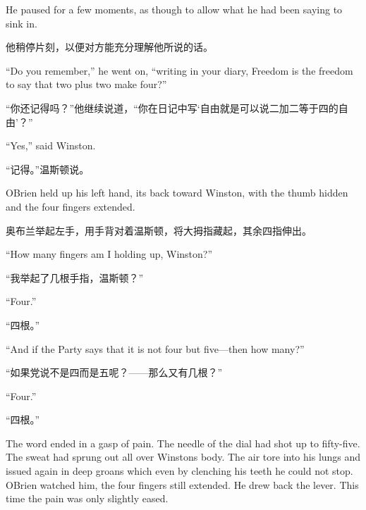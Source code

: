 \begin{paracol}{2}
\switchcolumn*

He paused for a few moments, as though to allow what he had been saying
to sink in.

\switchcolumn

他稍停片刻，以便对方能充分理解他所说的话。

\switchcolumn*

``Do you remember,'' he went on, ``writing in your diary,
\textquotesingle Freedom is the freedom to say that two plus two make
four\textquotesingle?''

\switchcolumn

``你还记得吗？''他继续说道，``你在日记中写`自由就是可以说二加二等于四的自由'？''

\switchcolumn*

``Yes,'' said Winston.

\switchcolumn

``记得。''温斯顿说。

\switchcolumn*

O\textquotesingle Brien held up his left hand, its back toward Winston,
with the thumb hidden and the four fingers extended.

\switchcolumn

奥布兰举起左手，用手背对着温斯顿，将大拇指藏起，其余四指伸出。

\switchcolumn*

``How many fingers am I holding up, Winston?''

\switchcolumn

``我举起了几根手指，温斯顿？''

\switchcolumn*

``Four.''

\switchcolumn

``四根。''

\switchcolumn*

``And if the Party says that it is not four but five---then how many?''

\switchcolumn

``如果党说不是四而是五呢？——那么又有几根？''

\switchcolumn*

``Four.''

\switchcolumn

``四根。''

\switchcolumn*

The word ended in a gasp of pain. The needle of the dial had shot up to
fifty-five. The sweat had sprung out all over Winston\textquotesingle s
body. The air tore into his lungs and issued again in deep groans which
even by clenching his teeth he could not stop. O\textquotesingle Brien
watched him, the four fingers still extended. He drew back the lever.
This time the pain was only slightly eased.


\end{paracol}
